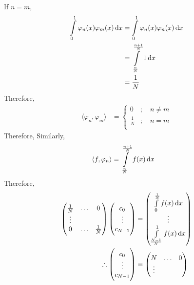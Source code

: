 \documentclass[fleqn, a4paper, 12pt, twoside, titlepage]{article}
\theoremstyle{definition}
\theoremstyle{theorem}
\begin{document}
\begin{solution}
\begin{align*}
	\end{align*}
	If $n = m$,
	\begin{align*}
		\int\limits_{0}^{1} \varphi_n(x) \varphi_m(x) \dif x &= \int\limits_{0}^{1} \varphi_n(x) \varphi_n(x) \dif x\\
		&= \int\limits_{\frac{n}{N}}^{\frac{n + 1}{N}} 1 \dif x\\
		&= \frac{1}{N}
	\end{align*}
	Therefore,
	\begin{align*}
		\langle \varphi_n,\varphi_m \rangle &=
			\begin{cases}
				0 &;\quad n \neq m\\
				\frac{1}{N} &;\quad n = m\\
			\end{cases}
	\end{align*}
	Therefore,
	Similarly,
	\begin{align*}
		\langle f,\varphi_n \rangle &= \int\limits_{\frac{n}{N}}^{\frac{n + 1}{N}} f(x) \dif x
	\end{align*}
	Therefore,
	\begin{align*}
			\begin{pmatrix}
				\frac{1}{N} & \dots & 0\\
				\vdots & &\\
				0 & \dots & \frac{1}{N}\\
			\end{pmatrix}
			\begin{pmatrix}
				c_0\\
				\vdots\\
				c_{N - 1}\\
			\end{pmatrix}
		&=
			\begin{pmatrix}
				\int\limits_{0}^{\frac{1}{N}} f(x) \dif x\\
				\vdots\\
				\int\limits_{\frac{N - 1}{N}}^{1} f(x) \dif x\\
			\end{pmatrix}\\
		\therefore
			\begin{pmatrix}
				c_0\\
				\vdots\\
				c_{N - 1}\\
			\end{pmatrix}
		&=
			\begin{pmatrix}
				N & \dots & 0\\
				\vdots & &\\

\end{pmatrix}
\end{align*}
\end{solution}
\end{document}

